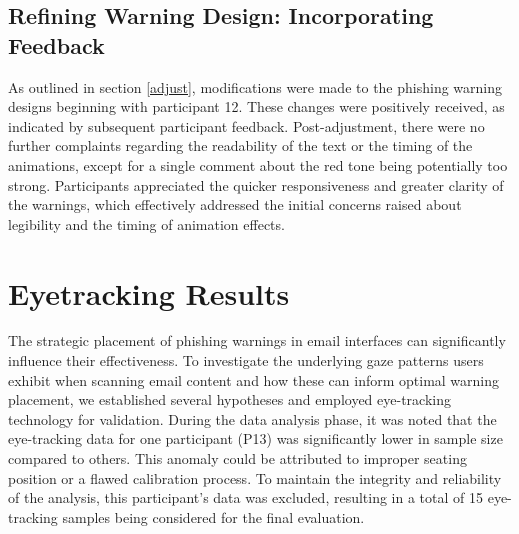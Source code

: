 \documentclass[
  a4paper,  %
  twoside,  %
  bibliography=totoc,
  headsepline,
  cleardoublepage=empty,
  parskip=half,
  draft=false
]{scrbook}
\begin{document}
\subsection{Refining Warning Design: Incorporating Feedback}
As outlined in section \ref{adjust}, modifications were made to the phishing warning designs beginning with participant 12. 
These changes were positively received, as indicated by subsequent participant feedback. Post-adjustment, there were no further complaints regarding the readability of the text or the timing of the animations, except for a single comment about the red tone being potentially too strong. Participants appreciated the quicker responsiveness and greater clarity of the warnings, which effectively addressed the initial concerns raised about legibility and the timing of animation effects.


\section{Eyetracking Results}
\label{sec:eyetrackingres}
The strategic placement of phishing warnings in email interfaces can significantly influence their effectiveness. To investigate the underlying gaze patterns users exhibit when scanning email content and how these can inform optimal warning placement, we established several hypotheses and employed eye-tracking technology for validation. \newline
During the data analysis phase, it was noted that the eye-tracking data for one participant (P13) was significantly lower in sample size compared to others. This anomaly could be attributed to improper seating position or a flawed calibration process. To maintain the integrity and reliability of the analysis, this participant's data was excluded, resulting in a total of 15 eye-tracking samples being considered for the final evaluation.
\end{document}
